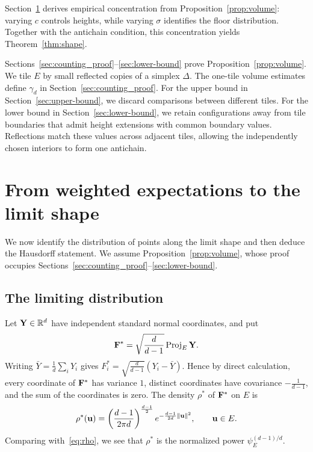 \documentclass[11pt,letterpaper]{article}
\begin{document}
Section~\ref{sec:shortcuts} derives empirical concentration from Proposition~\ref{prop:volume}: varying $c$ controls heights, while varying $\sigma$ identifies the floor distribution. Together with the antichain condition, this concentration yields Theorem~\ref{thm:shape}.

Sections~\ref{sec:counting_proof}--\ref{sec:lower-bound} prove Proposition~\ref{prop:volume}. We tile $E$ by small reflected copies of a simplex $\Delta$. The one-tile volume estimates define $\gamma_d$ in Section~\ref{sec:counting_proof}. For the upper bound in Section~\ref{sec:upper-bound}, we discard comparisons between different tiles. For the lower bound in Section~\ref{sec:lower-bound}, we retain configurations away from tile boundaries that admit height extensions with common boundary values. Reflections match these values across adjacent tiles, allowing the independently chosen interiors to form one antichain.

\section{From weighted expectations to the limit shape}\label{sec:shortcuts}

We now identify the distribution of points along the limit shape and then deduce the Hausdorff statement. We assume Proposition~\ref{prop:volume}, whose proof occupies Sections~\ref{sec:counting_proof}--\ref{sec:lower-bound}.

\subsection{The limiting distribution}


Let $\mathbf Y\in\mathbb R^d$ have independent standard normal coordinates, and put
\begin{equation}\label{eq:Fstar_definition}
      \mathbf F^\ast=\sqrt{\frac d{d-1}}\operatorname{Proj}_E\mathbf Y.
\end{equation}
Writing $\bar Y=\frac1d\sum_iY_i$ gives $F_i^\ast=\sqrt{\frac{d}{d-1}}(Y_i-\bar Y)$. Hence by direct calculation, every coordinate of $\mathbf F^\ast$ has variance $1$, distinct coordinates have covariance $-\frac1{d-1}$, and the sum of the coordinates is zero. The density $\rho^\ast$ of $\mathbf F^\ast$ on $E$ is
\begin{equation}\label{eq:rho-star}
      \rho^\ast(\mathbf u)=\left(\frac{d-1}{2\pi d}\right)^{\frac{d-1}{2}}
      e^{-\frac{d-1}{2d}\|\mathbf u\|^2},\qquad \mathbf u\in E.
\end{equation}
Comparing with~\eqref{eq:rho}, we see that $\rho^\ast$ is the normalized power $\psi_E^{(d-1)/d}$.
\end{document}
